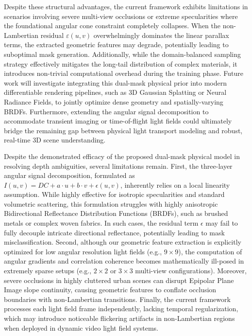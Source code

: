 \documentclass[lettersize,journal]{IEEEtran}
\begin{document}
Despite these structural advantages, the current framework exhibits limitations in scenarios involving severe multi-view occlusions or extreme specularities where the foundational angular cone constraint completely collapses. When the non-Lambertian residual $\varepsilon(u,v)$ overwhelmingly dominates the linear parallax terms, the extracted geometric features may degrade, potentially leading to suboptimal mask generation. Additionally, while the domain-balanced sampling strategy effectively mitigates the long-tail distribution of complex materials, it introduces non-trivial computational overhead during the training phase. Future work will investigate integrating this dual-mask physical prior into modern differentiable rendering pipelines, such as 3D Gaussian Splatting or Neural Radiance Fields, to jointly optimize dense geometry and spatially-varying BRDFs. Furthermore, extending the angular signal decomposition to accommodate transient imaging or time-of-flight light fields could ultimately bridge the remaining gap between physical light transport modeling and robust, real-time 3D scene understanding.

Despite the demonstrated efficacy of the proposed dual-mask physical model in resolving depth ambiguities, several limitations remain. First, the three-layer angular signal decomposition, formulated as $I(u,v) = DC + a\cdot u + b\cdot v + \epsilon(u,v)$, inherently relies on a local linearity assumption. While highly effective for isotropic specularities and standard volumetric scattering, this formulation struggles with highly anisotropic Bidirectional Reflectance Distribution Functions (BRDFs), such as brushed metals or complex woven fabrics. In such cases, the residual term $\epsilon$ may fail to fully decouple intricate directional reflectance, potentially leading to mask misclassification. Second, although our geometric feature extraction is explicitly optimized for low angular resolution light fields (e.g., $9 \times 9$), the computation of angular gradients and correlation coherence becomes mathematically ill-posed in extremely sparse setups (e.g., $2 \times 2$ or $3 \times 3$ multi-view configurations). Moreover, severe occlusions in highly cluttered urban scenes can disrupt Epipolar Plane Image slope continuity, causing geometric features to conflate occlusion boundaries with non-Lambertian transitions. Finally, the current framework processes each light field frame independently, lacking temporal regularization, which may introduce noticeable flickering artifacts in non-Lambertian regions when deployed in dynamic video light field systems.
\end{document}
